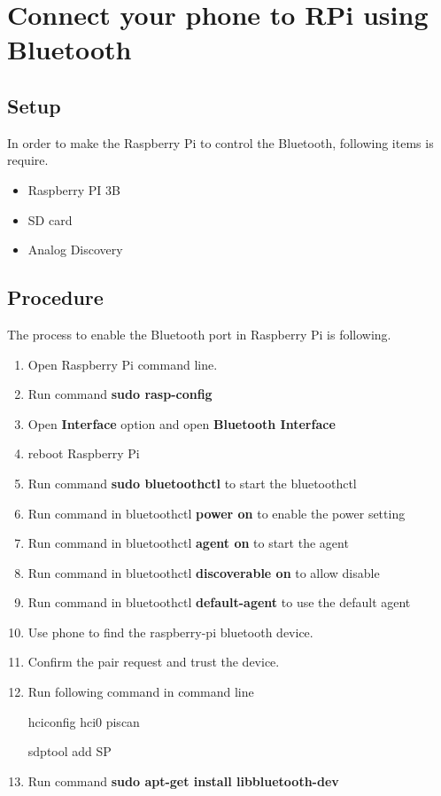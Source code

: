 \documentclass{article}
\begin{document}
\section{Connect your phone to RPi using Bluetooth}
\subsection{Setup}
In order to make the Raspberry Pi to control the Bluetooth, following items is require.
\begin{itemize}
	\item Raspberry PI 3B
	\item SD card
	\item Analog Discovery
\end{itemize}
\subsection{Procedure}
The process to enable the Bluetooth port in Raspberry Pi is following.
\begin{enumerate}[1)]
	\item Open Raspberry Pi command line.
	\item Run command \textbf{sudo rasp-config}
	\item Open \textbf{Interface} option and open \textbf{Bluetooth Interface}
	\item reboot Raspberry Pi
	\item Run command \textbf{sudo bluetoothctl} to start the bluetoothctl
	\item Run command in bluetoothctl \textbf{power on} to enable the power setting
	\item Run command in bluetoothctl \textbf{agent on} to start the agent
	\item Run command in bluetoothctl \textbf{discoverable on} to allow disable
	\item Run command in bluetoothctl \textbf{default-agent} to use the default agent
	\item Use phone to find the raspberry-pi bluetooth device.
	\item Confirm the pair request and trust the device.
	\item Run following command in command line
	\begin{center}
		hciconfig hci0 piscan
	\end{center}
	\begin{center}
		sdptool add SP
	\end{center}
	\item Run command \textbf{sudo apt-get install libbluetooth-dev}
\end{enumerate}
\end{document}
